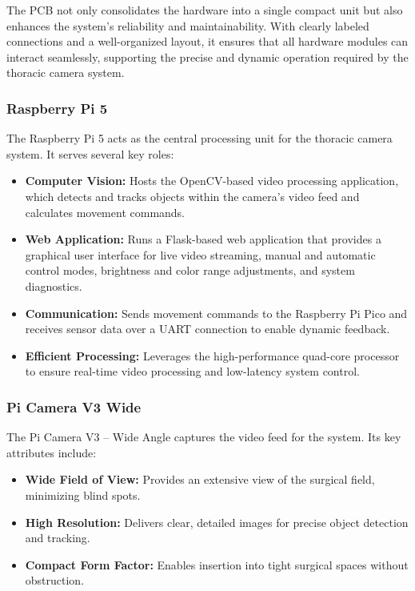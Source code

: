 The PCB not only consolidates the hardware into a single compact unit but also enhances the system's reliability and maintainability. With clearly labeled connections and a well-organized layout, it ensures that all hardware modules can interact seamlessly, supporting the precise and dynamic operation required by the thoracic camera system.

\subsubsection{Raspberry Pi 5}
The Raspberry Pi 5 acts as the central processing unit for the thoracic camera system. It serves several key roles:
\begin{itemize}
    \item \textbf{Computer Vision:} Hosts the OpenCV-based video processing application, which detects and tracks objects within the camera's video feed and calculates movement commands.
    \item \textbf{Web Application:} Runs a Flask-based web application that provides a graphical user interface for live video streaming, manual and automatic control modes, brightness and color range adjustments, and system diagnostics.
    \item \textbf{Communication:} Sends movement commands to the Raspberry Pi Pico and receives sensor data over a UART connection to enable dynamic feedback.
    \item \textbf{Efficient Processing:} Leverages the high-performance quad-core processor to ensure real-time video processing and low-latency system control.
\end{itemize}

\subsubsection{Pi Camera V3 Wide}
The Pi Camera V3 – Wide Angle captures the video feed for the system. Its key attributes include:
\begin{itemize}
    \item \textbf{Wide Field of View:} Provides an extensive view of the surgical field, minimizing blind spots.
    \item \textbf{High Resolution:} Delivers clear, detailed images for precise object detection and tracking.
    \item \textbf{Compact Form Factor:} Enables insertion into tight surgical spaces without obstruction.
\end{itemize}

